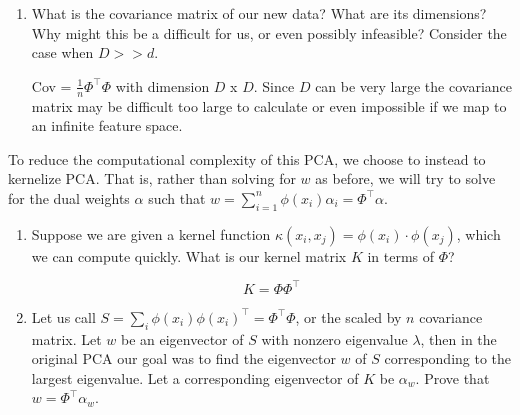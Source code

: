 \begin{Parts}
\begin{enumerate}
    \item What is the covariance matrix of our new data? What are its dimensions? Why might this be a difficult for us, or even possibly infeasible? Consider the case when $D >> d$.
    
\begin{solution}
        Cov = $\frac{1}{n}\Phi^{\top}\Phi$ with dimension $D$ x $D$. Since $D$ can be very large the covariance matrix may be difficult too large to calculate or even impossible if we map to an infinite feature space.
\end{solution}
\end{enumerate}

\item To reduce the computational complexity of this PCA, we choose to instead
    to kernelize PCA. That is, rather than solving for $w$ as before, we will
    try to solve for the dual weights $\alpha$ such that $w = \sum_{i = 1}^{n}
    \phi(x_i)\alpha_i = \Phi^{\top}\alpha$.
\begin{enumerate}
    \item Suppose we are given a kernel function $\kappa(x_i,x_j) = \phi(x_i) \cdot \phi(x_j)$, which we can compute quickly. What is our kernel matrix $K$ in terms of $\Phi$? 
    
\begin{solution}
    \begin{equation*}
        K = \Phi \Phi^{\top}
    \end{equation*}
\end{solution}
    
    \item Let us call $S = \sum_i\phi(x_i)\phi(x_i)^{\top} = \Phi^{\top} \Phi$, or the scaled by
        $n$ covariance matrix. Let $w$ be an eigenvector of $S$ with nonzero
        eigenvalue $\lambda$, then in the original PCA our goal was to find
        the eigenvector $w$ of $S$ corresponding to the largest eigenvalue. Let
        a corresponding eigenvector of $K$ be
        $\alpha_w$. Prove that $w = \Phi^{\top}\alpha_w$.
    

\end{enumerate}
\end{Parts}
